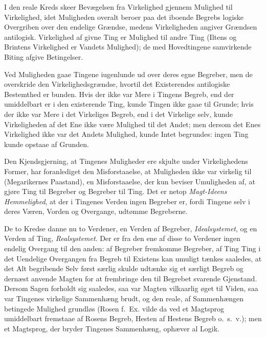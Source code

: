 \documentclass[12pt]{book}
\newcommand{\opage}[1]{\marginnote{\footnotesize\textit{[#1]}}}
\begin{document}
I den reale Kreds skeer Bevægelsen fra Virkelighed
gjennem Mulighed til Virkelighed, idet Muligheden overalt
beroer paa det iboende Begrebs logiske Overgriben over den
endelige Grændse, medens Virkeligheden angiver Grændsen
antilogisk. Virkelighed af givne Ting er Mulighed til andre
Ting (Iltens og Brintens Virkelighed er Vandets
Mulighed); de med Hovedtingene samvirkende Biting afgive
Betingelser.

\opage{44} Ved Muligheden gaae Tingene iugenlunde ud over
deres egne Begreber, men de overskride den
Virkelighedsgrændse, hvortil det Existerendes antilogiske Bestemthed er
bunden. Hvis der ikke var Mere i Tingens Begreb, end
der umiddelbart er i den existerende Ting, kunde Tingen
ikke gaae til Grunde; hvis der ikke var Mere i det
Virkeliges Begreb, end i det Virkelige selv, kunde Virkeligheden
af det Ene ikke være Mulighed til det Andet; men dersom
det Enes Virkelighed ikke var det Andets Mulighed, kunde
Intet begrundes: ingen Ting kunde opstaae af Grunden.

Den Kjendsgjerning, at Tingenes Muligheder ere skjulte
under Virkelighedens Former, har foranlediget den
Misforstaaelse, at Muligheden ikke var virkelig til
(Megarikernes Paastand), en Misforstaaelse, der kun beviser
Umuligheden af, at gjøre Ting til Begreber og Begreber til
Ting. Det er netop \emph{Magt-Ideens Hemmelighed}, at
der i Tingenes Verden ingen Begreber er, fordi Tingene
selv i deres Væren, Vorden og Overgange, udtømme
Begreberne.

De to Kredse danne nu to Verdener, en Verden af
Begreber, \emph{Idealsystemet}, og en Verden af Ting,
\emph{Realsystemet}. Der er fra den ene af disse to Verdener
ingen endelig Overgang til den anden: af Begreber
fremkomme Begreber, af Ting Ting i det Uendelige
Overgangen fra Begreb til Existens kan umuligt tænkes
saaledes, at det Alt begribende Selv først særlig skulde
udtænke sig et særligt Begreb og dernæst anvende Magten
for at frembringe den til Begrebet svarende Gjenstand.
Dersom Sagen forholdt sig saaledes, saa var Magten
vilkaarlig øget til Viden, saa var Tingenes virkelige
Sammenhæng brudt, og den reale, af Sammenhængen
betingede Mulighed grundløs (Rosen f.~Ex. vilde da ved et
Magtsprog umiddelbart fremstaae af Rosens Begreb, Hesten
\opage{45} af Hestens Begreb o.~s.~v.); men et Magtsprog, der bryder
Tingenes Sammenhæng, ophæver al Logik.
\end{document}
